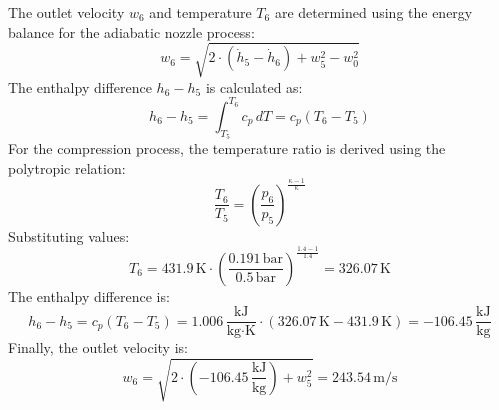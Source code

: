The outlet velocity \( w_6 \) and temperature \( T_6 \) are determined using the energy balance for the adiabatic nozzle process:  
\[
w_6 = \sqrt{2 \cdot (\dot{h}_5 - \dot{h}_6) + w_5^2 - w_0^2}
\]  
The enthalpy difference \( h_6 - h_5 \) is calculated as:  
\[
h_6 - h_5 = \int_{T_5}^{T_6} c_p \, dT = c_p (T_6 - T_5)
\]  
For the compression process, the temperature ratio is derived using the polytropic relation:  
\[
\frac{T_6}{T_5} = \left( \frac{p_6}{p_5} \right)^{\frac{\kappa - 1}{\kappa}}
\]  
Substituting values:  
\[
T_6 = 431.9 \, \text{K} \cdot \left( \frac{0.191 \, \text{bar}}{0.5 \, \text{bar}} \right)^{\frac{1.4 - 1}{1.4}} = 326.07 \, \text{K}
\]  
The enthalpy difference is:  
\[
h_6 - h_5 = c_p (T_6 - T_5) = 1.006 \, \frac{\text{kJ}}{\text{kg·K}} \cdot (326.07 \, \text{K} - 431.9 \, \text{K}) = -106.45 \, \frac{\text{kJ}}{\text{kg}}
\]  
Finally, the outlet velocity is:  
\[
w_6 = \sqrt{2 \cdot (-106.45 \, \frac{\text{kJ}}{\text{kg}}) + w_5^2} = 243.54 \, \text{m/s}
\]